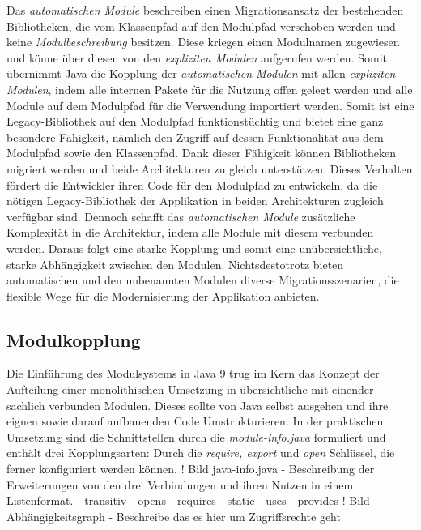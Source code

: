     Das \textit{automatischen Module} beschreiben einen Migrationsansatz der bestehenden Bibliotheken, die vom Klassenpfad auf den Modulpfad verschoben werden und keine \textit{Modulbeschreibung} besitzen. 
    Diese kriegen einen Modulnamen zugewiesen und könne über diesen von den \textit{expliziten Modulen} aufgerufen werden. 
    Somit übernimmt Java die Kopplung der \textit{automatischen Modulen} mit allen \textit{expliziten Modulen}, indem alle internen Pakete für die Nutzung offen gelegt werden und alle Module auf dem Modulpfad für die Verwendung importiert werden.
    Somit ist eine Legacy-Bibliothek auf den Modulpfad funktionstüchtig und bietet eine ganz besondere Fähigkeit, nämlich den Zugriff auf dessen Funktionalität aus dem Modulpfad sowie den Klassenpfad. 
    Dank dieser Fähigkeit können Bibliotheken migriert werden und beide Architekturen zu gleich unterstützen. 
    Dieses Verhalten fördert die Entwickler ihren Code für den Modulpfad zu entwickeln, da die nötigen Legacy-Bibliothek der Applikation in beiden Architekturen zugleich verfügbar sind. 
    Dennoch schafft das \textit{automatischen Module} zusätzliche Komplexität in die Architektur, indem 
    alle Module mit diesem verbunden werden. Daraus folgt eine starke Kopplung und somit eine unübersichtliche, starke Abhängigkeit zwischen den Modulen.
    \newline Nichtsdestotrotz bieten automatischen und den unbenannten Modulen diverse Migrationsszenarien, die flexible Wege für die Modernisierung der Applikation anbieten. 

  

 
\subsection{Modulkopplung}
		

Die Einführung des Modulsystems in Java 9 trug im Kern das Konzept der Aufteilung einer monolithischen Umsetzung in übersichtliche mit einender sachlich verbunden Modulen. 
Dieses sollte von Java selbst ausgehen und ihre eignen sowie darauf aufbauenden Code Umstrukturieren.
In der praktischen Umsetzung sind die Schnittstellen durch die \textit{module-info.java} formuliert und enthält drei Kopplungsarten: Durch die \textit{require, export} und \textit{open} Schlüssel, die ferner konfiguriert werden können. 
! Bild java-info.java
- Beschreibung der Erweiterungen von den drei Verbindungen und ihren Nutzen in einem Listenformat.
  - transitiv
  - opens
  - requires
  - static
  - uses
  - provides 
! Bild Abhängigkeitsgraph
-  Beschreibe das es hier um Zugriffsrechte geht 

